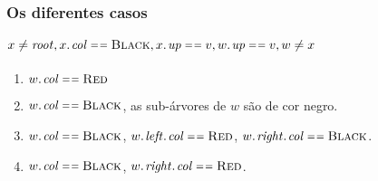 \documentclass{beamer}
\begin{document}
\begin{frame}
\frametitle{Os diferentes casos}
\framesubtitle{$x \neq \id{root}, \attrib{x}{col} \isequal \const{Black}, \attrib{x}{up} \isequal v, \attrib{w}{up} \isequal v, w \neq x$}

\begin{enumerate}
\item $\attrib{w}{col} \isequal \const{Red}$
\item $\attrib{w}{col} \isequal \const{Black}$, as sub-árvores de $w$ são de cor negro.
\item $\attrib{w}{col} \isequal \const{Black}$, 
$\attrib{\attrib{w}{left}}{col} \isequal \const{Red}$, 
$\attrib{\attrib{w}{right}}{col} \isequal \const{Black}$.
\item $\attrib{w}{col} \isequal \const{Black}$, 
$\attrib{\attrib{w}{right}}{col} \isequal \const{Red}$.
\end{enumerate}
\end{frame}
\end{document}
